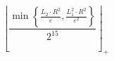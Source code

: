 \[\left\lfloor \frac{\min\left\{ \frac{L_2 \cdot R^{2}}{\varepsilon}, \frac{L_1^{2} \cdot R^{2}}{\varepsilon^{2}} \right\}}{2^{15}} \right\rfloor_{+}\]
